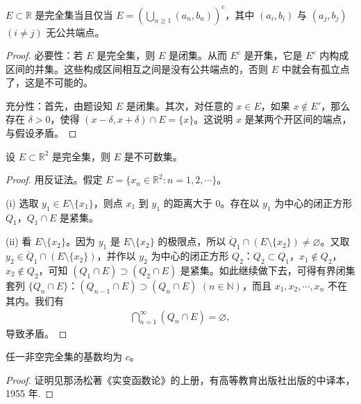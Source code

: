 \documentclass[../../main.tex]{subfiles}
\begin{document}
\begin{example}
\(E\subset\mathbb{R}\) 是完全集当且仅当 \(E = \left(\bigcup_{n\geqslant 1}(a_n,b_n)\right)^c\)，其中 \((a_i,b_i)\) 与 \((a_j,b_j)\) \((i\neq j)\) 无公共端点。
\end{example}
\begin{proof}
{\heiti 必要性：}若 \(E\) 是完全集，则 \(E\) 是闭集。从而 \(E^c\) 是开集，它是 \(E^c\) 内构成区间的并集。这些构成区间相互之间是没有公共端点的，否则 \(E\) 中就会有孤立点了，这是不可能的。

{\heiti 充分性：}首先，由题设知 \(E\) 是闭集。其次，对任意的 \(x\in E\)，如果 \(x\notin E'\)，那么存在 \(\delta>0\)，使得 \((x - \delta,x + \delta)\cap E = \{x\}\)。这说明 \(x\) 是某两个开区间的端点，与假设矛盾。
\end{proof}

\begin{example}
设 \(E\subset\mathbb{R}^2\) 是完全集，则 \(E\) 是不可数集。
\end{example}
\begin{proof}
用反证法。假定 \(E = \{x_n\in\mathbb{R}^2: n = 1,2,\cdots\}\)。

(i) 选取 \(y_1\in E\setminus\{x_1\}\)，则点 \(x_1\) 到 \(y_1\) 的距离大于 \(0\)。存在以 \(y_1\) 为中心的闭正方形 \(Q_1\)，\(Q_1\cap E\) 是紧集。

(ii) 看 \(E\setminus\{x_2\}\)。因为 \(y_1\) 是 \(E\setminus\{x_2\}\) 的极限点，所以 \(\mathring{Q}_1\cap (E\setminus\{x_2\})\neq\varnothing\)。又取 \(y_2\in\mathring{Q}_1\cap (E\setminus\{x_2\})\)，并作以 \(y_2\) 为中心的闭正方形 \(Q_2\)：\(Q_2\subset Q_1\)，\(x_1\notin Q_2\)，\(x_2\notin Q_2\)，可知 \((Q_1\cap E)\supset (Q_2\cap E)\) 是紧集。如此继续做下去，可得有界闭集套列 \(\{Q_n\cap E\}\)：\((Q_{n - 1}\cap E)\supset (Q_n\cap E)\) \((n\in\mathbb{N})\)，而且 \(x_1,x_2,\cdots,x_n\) 不在其内。我们有
\begin{align*}
\bigcap_{n = 1}^{\infty}(Q_n\cap E)=\varnothing,
\end{align*}
导致矛盾。 
\end{proof}

\begin{proposition}
任一非空完全集的基数均为 \(c\)。
\end{proposition}
\begin{proof}
证明见那汤松著《实变函数论》的上册，有高等教育出版社出版的中译本，1955 年.
\end{proof}
\end{document}
